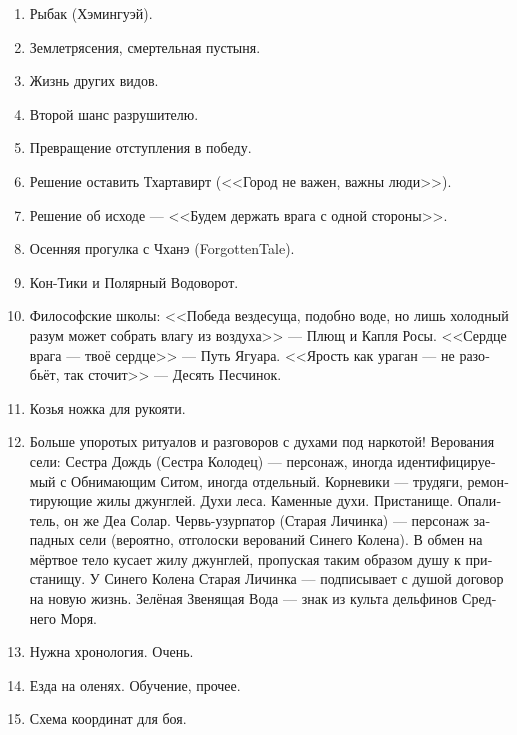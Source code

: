 \documentclass[a4paper,12pt,fleqn]{book}\usepackage{cooltooltips}\usepackage{polyglossia}\setdefaultlanguage[babelshorthands=true]{russian}\setotherlanguage{english}\defaultfontfeatures{Ligatures=TeX,Mapping=tex-text} \usepackage{xcolor}\definecolor{lightgray}{HTML}{bbbbbb}\color{lightgray}\newcommand{\ml}[3]{\textenglish{\textcolor{black}{#3}}}
\begin{document}
{\begin{enumerate}
\item Рыбак (Хэмингуэй).

\item Землетрясения, смертельная пустыня.

\item Жизнь других видов.

\item Второй шанс разрушителю.

\item Превращение отступления в победу.

\item Решение оставить Тхартавирт (<<Город не важен, важны люди>>).

\item Решение об исходе --- <<Будем держать врага с одной стороны>>.

\item Осенняя прогулка с Чханэ (ForgottenTale).

\item Кон-Тики и Полярный Водоворот.

\item Философские школы: <<Победа вездесуща, подобно воде, но лишь холодный разум может собрать влагу из воздуха>> --- Плющ и Капля Росы.
<<Сердце врага --- твоё сердце>> --- Путь Ягуара.
<<Ярость как ураган --- не разобьёт, так сточит>> --- Десять Песчинок.

\item Козья ножка для рукояти.

\item Больше упоротых ритуалов и разговоров с духами под наркотой!
Верования сели: Сестра Дождь (Сестра Колодец) --- персонаж, иногда идентифицируемый с Обнимающим Ситом, иногда отдельный.
Корневики --- трудяги, ремонтирующие жилы джунглей.
Духи леса.
Каменные духи.
Пристанище.
Опалитель, он же Деа Солар.
Червь-узурпатор (Старая Личинка) --- персонаж западных сели (вероятно, отголоски верований Синего Колена).
В обмен на мёртвое тело кусает жилу джунглей, пропуская таким образом душу к пристанищу.
У Синего Колена Старая Личинка --- подписывает с душой договор на новую жизнь.
Зелёная Звенящая Вода --- знак из культа дельфинов Среднего Моря.

\item Нужна хронология.
Очень.

\item Езда на оленях.
Обучение, прочее.

\item Схема координат для боя.


\end{enumerate}}
\end{document}
